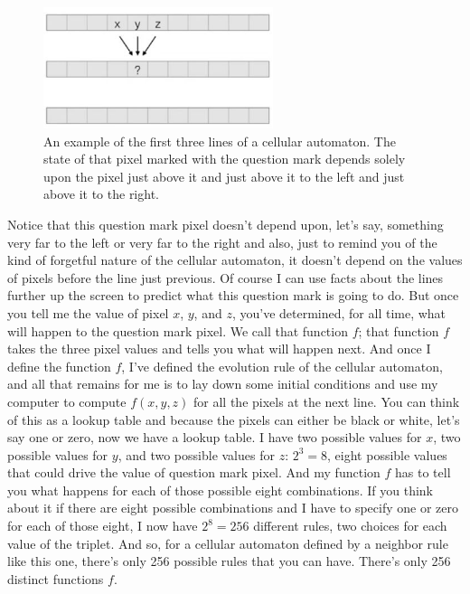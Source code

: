 \documentclass[]{article}
\begin{document}
\begin{figure}[H]
	\begin{center}
		\caption[An example of the first three lines
		of a cellular automaton]{An example of the first three lines
			of a cellular automaton. The state of that pixel marked
			with the question mark depends solely upon the pixel just above it and just above it to the left and just above it to the right.}\label{fig:cellular-automaton-rule}
		\includegraphics[width=0.6\textwidth]{cellular-automaton-rule}
	\end{center}
\end{figure}
Notice that this question mark pixel doesn't depend upon, let's say, something very far to the left or very far to the right and also, just to remind you of the kind of forgetful nature of the cellular automaton, it doesn't depend on the values of pixels
before the line just previous.
Of course I can use facts about the lines further up the screen to predict
what this question mark is going to do.
But once you tell me the value of pixel $x$, $y$, and $z$, you've determined, for all time, what will happen to the question mark pixel.
We call that function $f$; that function $f$ takes the three pixel values and tells you what will happen next.
And once I define the function $f$, I've defined the evolution rule of the cellular automaton, and all that remains for me is to lay down some initial conditions and use my computer to compute $f(x,y,z)$ for all the pixels at the next line.
You can think of this as a lookup table and because the pixels can either be black or white, let's say one or zero, now we have a lookup table.
I have two possible values for $x$, two possible values for $y$, and two possible values for $z$: $2^3=8$, eight possible values that could drive the value of
question mark pixel.
And my function $f$ has to tell you what happens for each of those possible eight combinations.
If you think about it if there are eight possible combinations and I have to specify one or zero for each of those eight, I now have $2^8=256$ different rules, two choices for each value of the triplet.
And so, for a cellular automaton defined by a neighbor rule like this one, there's only 256 possible rules that you can have.
There's only 256 distinct functions $f$.
\end{document}
